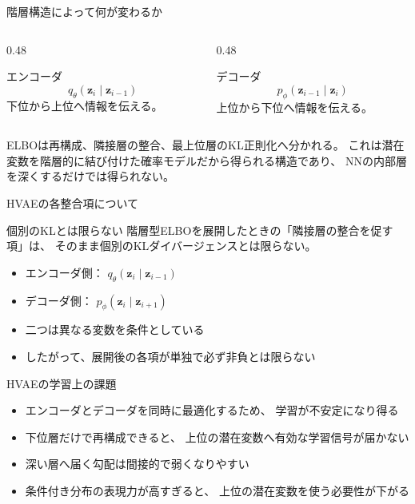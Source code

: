 \begin{frame}{階層構造によって何が変わるか}
    \begin{columns}[T]
        \begin{column}{0.48\textwidth}
            \begin{block}{エンコーダ}
                \[
                    q_\theta(\boldsymbol{z}_i
                    \mid\boldsymbol{z}_{i-1})
                \]
                下位から上位へ情報を伝える。
            \end{block}
        \end{column}
        \begin{column}{0.48\textwidth}
            \begin{exampleblock}{デコーダ}
                \[
                    p_\phi(\boldsymbol{z}_{i-1}
                    \mid\boldsymbol{z}_i)
                \]
                上位から下位へ情報を伝える。
            \end{exampleblock}
        \end{column}
    \end{columns}
    \vspace{0.7em}
    ELBOは再構成、隣接層の整合、最上位層のKL正則化へ分かれる。
    これは潜在変数を階層的に結び付けた確率モデルだから得られる構造であり、
    NNの内部層を深くするだけでは得られない。
\end{frame}
\begin{frame}{HVAEの各整合項について}
    \begin{alertblock}{個別のKLとは限らない}
        階層型ELBOを展開したときの「隣接層の整合を促す項」は、
        そのまま個別のKLダイバージェンスとは限らない。
    \end{alertblock}
    \begin{itemize}
        \item エンコーダ側：
        $q_\theta(\boldsymbol{z}_i\mid\boldsymbol{z}_{i-1})$
        \item デコーダ側：
        $p_\phi(\boldsymbol{z}_i\mid\boldsymbol{z}_{i+1})$
        \item 二つは異なる変数を条件としている
        \item したがって、展開後の各項が単独で必ず非負とは限らない
    \end{itemize}
\end{frame}
\begin{frame}{HVAEの学習上の課題}
    \begin{itemize}
        \item エンコーダとデコーダを同時に最適化するため、
        学習が不安定になり得る
        \item 下位層だけで再構成できると、
        上位の潜在変数へ有効な学習信号が届かない
        \item 深い層へ届く勾配は間接的で弱くなりやすい
        \item 条件付き分布の表現力が高すぎると、
        上位の潜在変数を使う必要性が下がる
    \end{itemize}
\end{frame}
